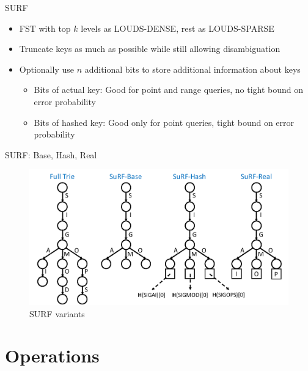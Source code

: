 \documentclass{beamer}
\begin{document}
\begin{frame}{SURF}
		\begin{itemize}
				\item FST with top $k$ levels as LOUDS-DENSE, rest as
						LOUDS-SPARSE
				\item Truncate keys as much as possible while still allowing
						disambiguation
				\item Optionally use $n$ additional bits to store additional
						information about keys
						\begin{itemize}
								\item Bits of actual key: Good for point and
										range queries, no tight bound on error
										probability
								\item Bits of hashed key: Good only for point
										queries, tight bound on error
										probability
						\end{itemize}
		\end{itemize}
\end{frame}

\begin{frame}{SURF: Base, Hash, Real}
		\begin{figure}
				\centering
				\includegraphics[width=\textwidth]{resources/surf}
				\caption{SURF variants \autocite{zhangSuRFPracticalRange2018}}
		\end{figure}
\end{frame}

\section{Operations}
\end{document}
